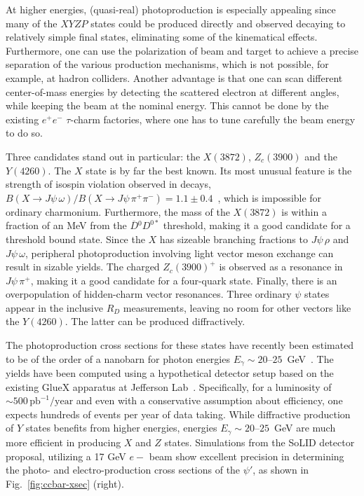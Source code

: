 At higher energies, (quasi-real) photoproduction is especially appealing since many of the $XYZP$ states could be produced directly and observed decaying to relatively simple final states, eliminating some of the kinematical effects. 
Furthermore, one can use the polarization of beam and target to achieve a precise separation of the various production mechanisms, which is not possible, for example, at hadron colliders.
Another advantage is that one can scan different center-of-mass energies by detecting the scattered electron at different angles, while keeping the beam at the nominal energy. This cannot be done by the existing $e^+e^-$ $\tau$-charm factories, where one has to tune carefully the beam energy to do so.

Three candidates stand out in particular: the   $X(3872)$, $Z_c(3900)$ and the $Y(4260)$.  The $X$ state is by far the best known. Its most unusual feature is the strength of isospin violation observed in decays,   $B(X\to J\psi\,\omega)/B(X\to J\psi\,\pi^+\pi^-) = 1.1\pm 0.4$~\cite{Zyla:2020zbs}, which is impossible for ordinary charmonium. 
Furthermore, the  mass of the $X(3872)$ is within a fraction of an MeV from the $\overline{D} {}^0 D^{0*}$ threshold, making it a good candidate for a threshold bound state.   Since the $X$ has sizeable branching fractions to $J\psi \,\rho$ and $J\psi \,\omega$, peripheral photoproduction involving light vector meson exchange can result in  sizable yields. 
The charged $Z_c(3900)^+$ is observed as a resonance in  $J\psi \, \pi^+$,  making it a good candidate for a four-quark state. Finally, there is an overpopulation of hidden-charm vector resonances. Three ordinary $\psi$ states appear in the inclusive $R_D$ measurements, leaving no room for other vectors like the $Y(4260)$. The latter can be produced diffractively.
    
    
The photoproduction cross sections for these states have recently  been estimated to be of the order of a nanobarn for photon energies $E_\gamma \sim 20$--$25$~GeV~\cite{Albaladejo:2020tzt}. 
The yields have been computed using a hypothetical detector setup based on the existing GlueX apparatus at Jefferson Lab~\cite{Adhikari:2020cvz}. Specifically, for a luminosity of $\sim 500\,\text{pb}^{-1}/\text{year}$ and even with a conservative assumption about  efficiency, one expects hundreds of events per year of data taking.
While diffractive production of $Y$ states benefits from higher energies, energies $E_\gamma \sim 20$--$25$~GeV are much more efficient in producing $X$ and $Z$ states. Simulations from the SoLID detector proposal, utilizing a 17 GeV $e-$ beam show excellent precision in determining the photo- and electro-production cross sections of the $\psi'$, as shown in Fig.~\ref{fig:ccbar-xsec} (right).

